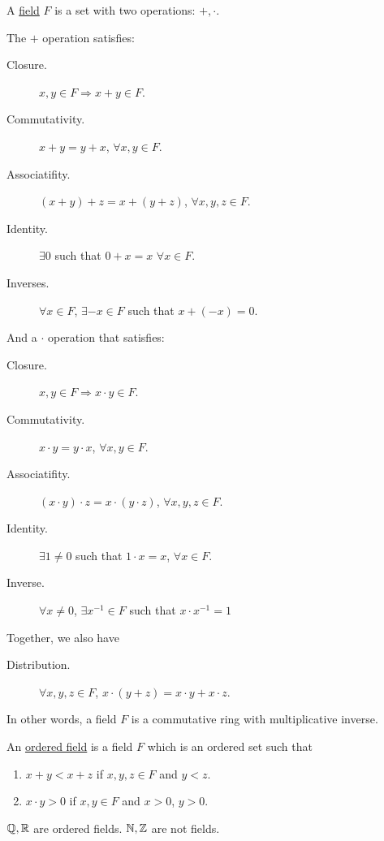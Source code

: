 \begin{definition}
    A \ul{field} $F$ is a set with two operations: $+, \cdot$.

    The $+$ operation satisfies:
    \begin{description}
        \item[Closure.] $x, y\in F\Rightarrow x + y\in F$.
        \item[Commutativity.] $x + y = y + x$, $\forall x, y\in F$.
        \item[Associatifity.] $(x + y) + z = x + (y + z)$, $\forall x, y, z\in F$.
        \item[Identity.] $\exists 0$ such that $0 + x = x$ $\forall x\in F$.
        \item[Inverses.] $\forall x\in F$, $\exists -x\in F$ such that $x + (-x) = 0$.
    \end{description}

    And a $\cdot$ operation that satisfies:
    \begin{description}
        \item[Closure.] $x, y\in F\Rightarrow x \cdot y\in F$.
        \item[Commutativity.] $x \cdot y = y \cdot x$, $\forall x, y\in F$.
        \item[Associatifity.] $(x \cdot y) \cdot z = x \cdot (y \cdot z)$, $\forall x, y, z\in F$.
        \item[Identity.] $\exists 1 \neq 0$ such that $1\cdot x = x$, $\forall x\in F$.
        \item[Inverse.] $\forall x\neq 0$, $\exists x^{-1}\in F$ such that $x\cdot x^{-1} = 1$
    \end{description}

    Together, we also have
    \begin{description}
        \item[Distribution.] $\forall x, y, z\in F$, $x\cdot (y + z) = x\cdot y + x\cdot z$.
    \end{description}

    In other words, a field $F$ is a commutative ring with multiplicative inverse.
\end{definition}
\begin{definition}
    An \ul{ordered field} is a field $F$ which is an ordered set such that
    \begin{enumerate}
        \item $x + y < x + z$ if $x, y, z\in F$ and $y < z$.
        \item $x\cdot y > 0$ if $x, y\in F$ and $x > 0$, $y > 0$.
    \end{enumerate}
\end{definition}
\begin{example}
    $\mathbb Q, \mathbb R$ are ordered fields. $\mathbb N, \mathbb Z$ are not fields.
\end{example}

